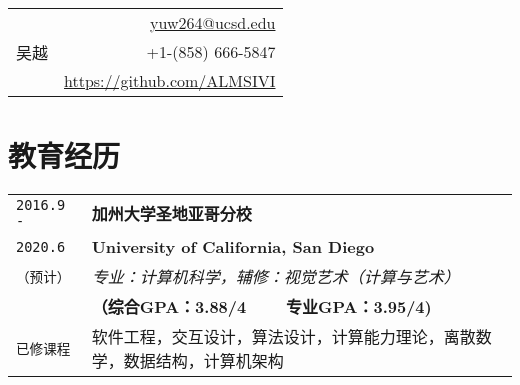 \documentclass[UTF8]{ctexart}
\begin{document}
	\pagestyle{plain}
	\noindent
	\begin{tabularx}{\linewidth}{X r}
		\multirow{3}{*}{\Huge 吴越}
		& \href{mailto:yuw264@ucsd.edu}{yuw264@ucsd.edu} \\
		& +1-(858) 666-5847 \\
		& \href{https://github.com/ALMSIVI}{https://github.com/ALMSIVI}
	\end{tabularx}
	
	\smallskip
	
	\section{教育经历}
	\smallskip
	\noindent
	\begin{tabularx}{\linewidth}{l | X}	
		\texttt{2016.9 -} & \textbf{\large 加州大学圣地亚哥分校} \\
		\texttt{2020.6} & \textbf{University of California, San Diego} \\
		\texttt{（预计）} & \textit{专业：计算机科学，辅修：视觉艺术（计算与艺术）} \\
		& \textbf{（综合GPA：3.88/4 ~~~ 专业GPA：3.95/4)} \\
		\texttt{已修课程} & 软件工程，交互设计，算法设计，计算能力理论，离散数学，数据结构，计算机架构
	\end{tabularx}
	
	\smallskip
	
\end{document}
